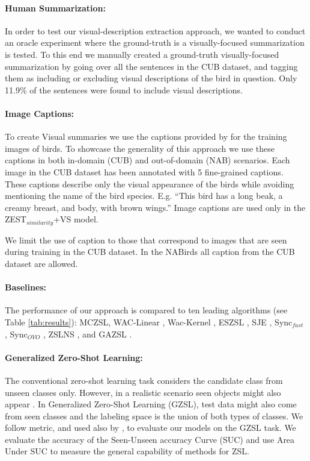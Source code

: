 \documentclass[11pt,a4paper]{article}
\begin{document}
\paragraph{Human Summarization:} 
In order to test our visual-description extraction approach, we wanted to conduct an oracle experiment where the ground-truth is a visually-focused summarization is tested. To this end we manually created a ground-truth visually-focused summarization by going over all the sentences in the CUB dataset, and tagging them as including or excluding visual descriptions of the bird in question. Only 11.9\% of the sentences were found to include visual descriptions.  

\paragraph{Image Captions:}
To create Visual summaries we use the captions provided by \citet{reed2016learning} for the training images of birds. To showcase the generality of this approach we use these captions in both in-domain (CUB) and out-of-domain (NAB) scenarios.
Each image in the CUB dataset has been annotated with 5 fine-grained captions. These captions describe only the visual appearance of the birds while avoiding mentioning the name of the bird species. E.g. \enquote{This bird has a long beak, a creamy breast, and body, with brown wings.} Image captions 
are used only in the ZEST$_{similarity}$+VS model.
\par

We limit the use of caption to those that correspond to  images that are seen during training in the CUB dataset. In the NABirds all caption from the CUB dataset are allowed.


\paragraph{Baselines:}  The performance of
our approach is compared to ten leading algorithms (see Table \ref{tab:results}): MCZSL\citep{akata2016multi}, WAC-Linear \citep{elhoseiny2013write}, Wac-Kernel \citep{elhoseiny2016write}, ESZSL \citep{romera2015embarrassingly}, SJE \citep{akata2015evaluation}, Sync$_{fast}$ \citep{changpinyo2016synthesized}, Sync$_{OVO}$ \citep{changpinyo2016synthesized},
ZSLNS \citep{qiao2016less}, and GAZSL \citep{zhu2018generative}. 




\paragraph{Generalized Zero-Shot Learning:} 
The conventional zero-shot learning task considers the candidate class from unseen classes only. However, in a realistic scenario seen objects might also appear \cite{chao2016empirical}. In Generalized Zero-Shot Learning (GZSL), test data might also come from seen classes and the labeling space is the union of both types of classes. We follow \citet{chao2016empirical} metric, and used also by \citet{zhu2018generative}, to evaluate our models on the GZSL task. We evaluate the accuracy of the Seen-Unseen accuracy Curve (SUC) and use Area Under SUC to measure the general capability of methods for ZSL.
\end{document}
